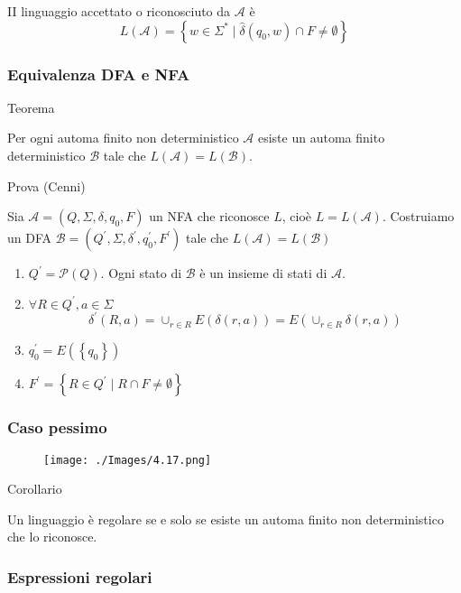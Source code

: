 II linguaggio accettato o riconosciuto da $\mathcal{A}$ è
$$
L(\mathcal{A})=\left\{w \in \Sigma^{*} \mid \hat{\delta}\left(q_{0}, w\right) \cap F \neq \emptyset\right\}
$$

\subsubsection{Equivalenza DFA e NFA}

Teorema

Per ogni automa finito non deterministico $\mathcal{A}$ esiste un automa finito deterministico $\mathcal{B}$ tale che $L(\mathcal{A})=L(\mathcal{B})$.

Prova (Cenni) 

Sia $\mathcal{A}=\left(Q, \Sigma, \delta, q_{0}, F\right)$ un NFA che riconosce $L$, cioè $L=L(\mathcal{A})$. Costruiamo un DFA $\mathcal{B}=\left(Q^{\prime}, \Sigma, \delta^{\prime}, q_{0}^{\prime}, F^{\prime}\right)$ tale che $L(\mathcal{A})=L(\mathcal{B})$
\begin{enumerate}
    \item $Q^{\prime}=\mathcal{P}(Q)$.
Ogni stato di $\mathcal{B}$ è un insieme di stati di $\mathcal{A} .$
    \item $\forall R \in Q^{\prime}, a \in \Sigma$
$$
\delta^{\prime}(R, a)=\cup_{r \in R} E(\delta(r, a))=E\left(\cup_{r \in R} \delta(r, a)\right)
$$
    \item $q_{0}^{\prime}=E\left(\left\{q_{0}\right\}\right)$
    \item $F^{\prime}=\left\{R \in Q^{\prime} \mid R \cap F \neq \emptyset\right\}$
\end{enumerate}

\subsubsection{Caso pessimo}

\begin{figure}[hbpt!]
    \centering
    \texttt{[image: ./Images/4.17.png]}
\end{figure}
\FloatBarrier

Corollario

Un linguaggio è regolare se e solo se esiste un automa finito non
deterministico che lo riconosce.

\subsubsection{Espressioni regolari}

